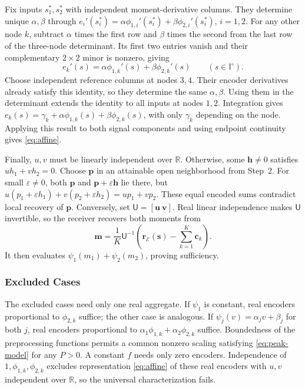 \documentclass[journal,12pt,onecolumn,draftclsnofoot]{IEEEtran}
\newcommand{\enc}{\mathscr{E}}\newcommand{\dec}{\mathscr{D}}\newcommand{\R}{\mathbb R}\newcommand{\C}{\mathbb C}
\begin{document}
Fix inputs $s_1^*,s_2^*$ with independent moment-derivative
columns. They determine unique $\alpha,\beta$ through
$e_i'(s_i^*)=\alpha\phi_{1,i}'(s_i^*)+\beta\phi_{2,i}'(s_i^*)$,
$i=1,2$. For any other node $k$, subtract $\alpha$ times the first
row and $\beta$ times the second from the last row of the
three-node determinant. Its first two entries vanish and their
complementary $2\times2$ minor is nonzero, giving
$$
 e_k'(s)=\alpha\phi_{1,k}'(s)+\beta\phi_{2,k}'(s)
 \qquad(s\in\mathbb I^\circ).
$$
Choose independent reference columns at nodes $3,4$.
Their encoder derivatives already satisfy this identity, so they
determine the same $\alpha,\beta$. Using them in the determinant
extends the identity to all inputs at nodes $1,2$.
Integration gives
$e_k(s)=\gamma_k+\alpha\phi_{1,k}(s)+\beta\phi_{2,k}(s)$,
with only $\gamma_k$ depending on the node. Applying this result
to both signal components and using endpoint continuity gives
\eqref{eq:affine}.





Finally, $u,v$ must be linearly independent over $\R$. Otherwise,
some $\boldsymbol h\ne0$ satisfies $uh_1+vh_2=0$. Choose
$\boldsymbol p$ in an attainable open neighborhood from Step~2.
For small $\varepsilon\ne0$, both $\boldsymbol p$ and
$\boldsymbol p+\varepsilon\boldsymbol h$ lie there, but
$u(p_1+\varepsilon h_1)+v(p_2+\varepsilon h_2)=up_1+vp_2$.
These equal encoded sums contradict local recovery of $\boldsymbol p$. Conversely, set $\mathsf U=[\boldsymbol u\ \boldsymbol v]$.
Real linear independence makes $\mathsf U$ invertible, so the
receiver recovers both moments from
$$
\boldsymbol m=\frac1K\mathsf U^{-1}
\left(\boldsymbol r_\enc(\boldsymbol s)-\sum_{k=1}^K\boldsymbol c_k\right).
$$
It then evaluates $\psi_1(m_1)+\psi_2(m_2)$, proving sufficiency.





\subsubsection{Excluded Cases} 
The excluded cases need only one real aggregate. If $\psi_1$ is
constant, real encoders proportional to $\phi_{2,k}$ suffice;
the other case is analogous. If $\psi_j(v)=\alpha_jv+\beta_j$
for both $j$, real encoders proportional to
$\alpha_1\phi_{1,k}+\alpha_2\phi_{2,k}$ suffice.
Boundedness of the preprocessing functions permits a common
nonzero scaling satisfying \eqref{eq:peak-model} for any $P>0$.
A constant $f$ needs only zero encoders.
Independence of $1,\phi_{1,k},\phi_{2,k}$ excludes representation
\eqref{eq:affine} of these real encoders with $u,v$ independent over $\R$, so the universal characterization fails.
\end{document}
